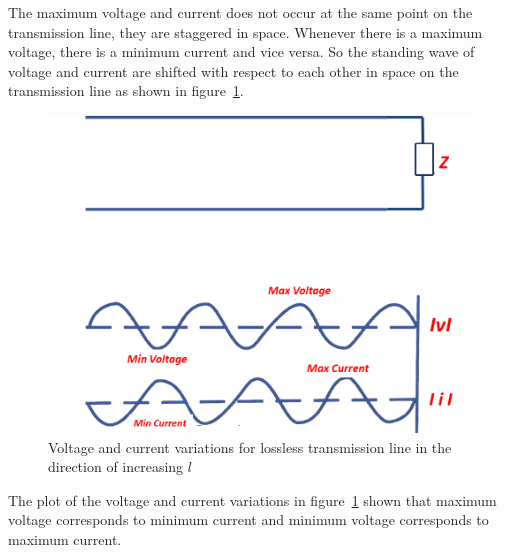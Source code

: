 The maximum voltage and current does not occur at the same point on the transmission line, they are staggered in space. Whenever there is a maximum voltage, there is a minimum current and vice versa. So the standing wave of voltage and current are shifted with respect to each other in space on the transmission line as shown in figure~\ref{fig:asdfghjhgfdsa}. 
\begin{figure}[h]
\centering
\includegraphics[width=0.7\linewidth]{./graphics/fig5.4modified}
\caption{Voltage and current variations for lossless transmission line in the direction of increasing $l$}
\label{fig:asdfghjhgfdsa}
\end{figure}

The plot of the voltage and current variations in figure~\ref{fig:asdfghjhgfdsa} shown that maximum voltage corresponds to minimum current and minimum voltage corresponds to maximum current.

